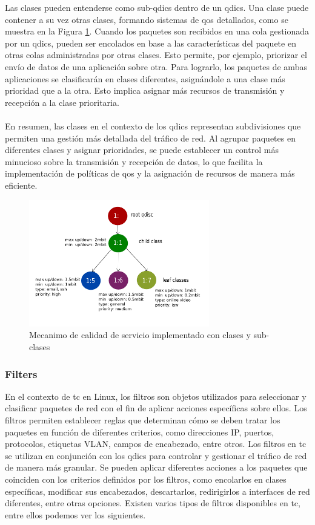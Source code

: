 Las clases pueden entenderse como sub-qdics dentro de un qdics. Una clase puede contener a su vez otras clases, formando sistemas de  \gls{qos} detallados, como se muestra en la Figura \ref{fig:linuxNet_tc}. Cuando los paquetes son recibidos en una cola gestionada por un qdics, pueden ser encolados en base a las características del paquete en otras colas administradas por otras clases. Esto permite, por ejemplo, priorizar el envío de datos de una aplicación sobre otra. Para lograrlo, los paquetes de ambas aplicaciones se clasificarán en clases diferentes, asignándole a una clase más prioridad que a la otra. Esto implica asignar más recursos de transmisión y recepción a la clase prioritaria.\\
\\
En resumen, las clases en el contexto de los qdics representan subdivisiones que permiten una gestión más detallada del tráfico de red. Al agrupar paquetes en diferentes clases y asignar prioridades, se puede establecer un control más minucioso sobre la transmisión y recepción de datos, lo que facilita la implementación de políticas de \gls{qos} y la asignación de recursos de manera más eficiente.
\begin{figure}[ht]
    \centering
    \includegraphics[width=0.7\textwidth]{archivos/img/teoria/tc_qdisc_example_implementation.png}
    \caption{Mecanimo de calidad de servicio implementado con clases y sub-clases \cite{qdiscs}}
    \label{fig:linuxNet_tc}
\end{figure}


\subsubsection{Filters}

En el contexto de \gls{tc} en Linux, los filtros son objetos utilizados para seleccionar y clasificar paquetes de red con el fin de aplicar acciones específicas sobre ellos. Los filtros permiten establecer reglas que determinan cómo se deben tratar los paquetes en función de diferentes criterios, como direcciones IP, puertos, protocolos, etiquetas VLAN, campos de encabezado, entre otros. Los filtros en \gls{tc} se utilizan en conjunción con los qdics para controlar y gestionar el tráfico de red de manera más granular. Se pueden aplicar diferentes acciones a los paquetes que coinciden con los criterios definidos por los filtros, como encolarlos en clases específicas, modificar sus encabezados, descartarlos, redirigirlos a interfaces de red diferentes, entre otras opciones. Existen varios tipos de filtros disponibles en \gls{tc}, entre ellos podemos ver los siguientes.

